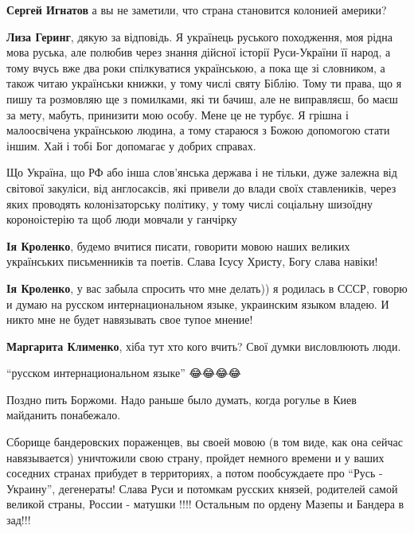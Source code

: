 \begin{itemize}
{\begin{itemize}
\textbf{Сергей Игнатов} а вы не заметили, что страна становится колонией америки?

\textbf{Лиза Геринг}, дякую за відповідь. Я українець руського походження, моя
рідна мова руська, але полюбив через знання дійсної історії Руси-України її
народ, а тому вчусь вже два роки спілкуватися українською, а пока ще зі
словником, а також читаю українськи книжки, у тому числі святу Біблію. Тому ти
права, що я пишу та розмовляю ще з помилками, які ти бачиш, але не виправляєш,
бо маєш за мету, мабуть, принизити мою особу. Мене це не турбує. Я грішна і
малоосвічена українською людина, а тому стараюся з Божою допомогою стати іншим.
Хай і тобі Бог допомагає у добрих справах.

Що Україна, що РФ або інша слов'янська держава і не тільки, дуже залежна від
світової закуліси, від англосаксів, які привели до влади своїх ставлеників,
через яких проводять колонізаторську політику, у тому числі соціальну шизоїдну
короноістерію та щоб люди мовчали у ганчірку

\textbf{Ія Кроленко}, будемо вчитися писати, говорити мовою наших великих
українських письменників та поетів. Слава Ісусу Христу, Богу слава навіки!

\textbf{Ія Кроленко}, у вас забыла спросить что мне делать)) я родилась в СССР,
говорю и думаю на русском интернациональном языке, украинским языком владею. И
никто мне не будет навязывать свое тупое мнение!

\textbf{Маргарита Клименко}, хіба тут хто кого вчить? Свої думки висловлюють люди.

\enquote{русском интернациональном языке} 😂😂😂😂

\end{itemize}

Поздно пить Боржоми. Надо раньше было думать, когда рогулье в Киев майданить понабежало.


Сборище бандеровских пораженцев, вы своей мовою (в том виде, как она сейчас
навязывается) уничтожили свою страну, пройдет немного времени и у ваших
соседних странах прибудет в территориях, а потом пообсуждаете про \enquote{Русь -
Украину}, дегенераты! Слава Руси и потомкам русских князей, родителей самой
великой страны, России - матушки !!!! Остальным по ордену Мазепы и Бандера в
зад!!!

}
\end{itemize}
